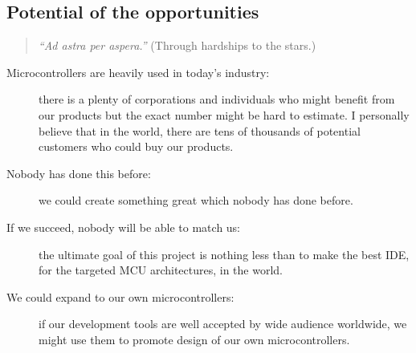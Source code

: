 \documentclass[a4paper,twoside,15pt]{book}
\begin{document}
		\subsection{Potential of the opportunities}
			\begin{quote}
				\textit{``Ad astra per aspera.''} \small{(Through hardships to the stars.)}
			\end{quote}
			 \begin{description}
					\item[Microcontrollers are heavily used in today's industry:]
						there is a plenty of corporations and individuals who might benefit from our products but the exact number might be hard to estimate. I personally believe that in the world, there are tens of thousands of potential customers who could buy our products.
					\item[Nobody has done this before:]
						we could create something great which nobody has done before.
					\item[If we succeed, nobody will be able to match us:]
						the ultimate goal of this project is nothing less than to make the best IDE, for the targeted MCU architectures, in the world.
					\item[We could expand to our own microcontrollers:]
						if our development tools are well accepted by wide audience worldwide, we might use them to promote design of our own microcontrollers.
			\end{description}
\end{document}
